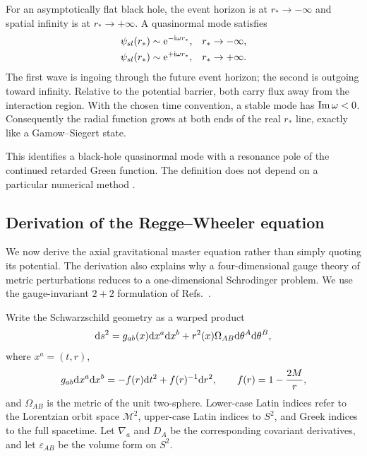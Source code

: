For an asymptotically flat black hole, the event horizon is at
$r_*\to-\infty$ and spatial infinity is at $r_*\to+\infty$.  A quasinormal
mode satisfies
\begin{align}
  \psi_{sl}(r_*)&\sim\mathrm{e}^{-\mathrm{i}\omega r_*},
  &&r_*\to-\infty,
  \notag\\
  \psi_{sl}(r_*)&\sim\mathrm{e}^{+\mathrm{i}\omega r_*},
  &&r_*\to+\infty .
  \label{eq:qnm-boundary-flat}
\end{align}
The first wave is ingoing through the future event horizon; the second is
outgoing toward infinity.  Relative to the potential barrier, both carry flux
away from the interaction region.  With the chosen time convention, a stable
mode has $\operatorname{Im}\omega<0$.  Consequently the radial function grows at both ends
of the real $r_*$ line, exactly like a Gamow--Siegert state.

This identifies a black-hole quasinormal mode with a resonance pole of the
continued retarded Green function.  The definition does not depend on a
particular numerical method
\cite{Kokkotas:1999bd,Berti:2009kk,Hatsuda:2021gtn}.

\subsection{Derivation of the Regge--Wheeler equation}
\label{subsec:regge-wheeler-derivation}

We now derive the axial gravitational master equation rather than simply
quoting its potential.  The derivation also explains why a four-dimensional
gauge theory of metric perturbations reduces to a one-dimensional
Schrodinger problem.  We use the gauge-invariant $2+2$ formulation of
Refs.~\cite{Regge:1957td,Moncrief:1974am,Martel:2005ir,Nagar:2005ea}.

Write the Schwarzschild geometry as a warped product
\begin{equation}
  \mathrm{d} s^2=g_{ab}(x)\mathrm{d} x^a\mathrm{d} x^b
  +r^2(x)\Omega_{AB}\mathrm{d}\theta^A\mathrm{d}\theta^B,
  \label{eq:schwarzschild-warped-product}
\end{equation}
where $x^a=(t,r)$,
\begin{equation}
  g_{ab}\mathrm{d} x^a\mathrm{d} x^b
  =-f(r)\mathrm{d} t^2+f(r)^{-1}\mathrm{d} r^2,
  \qquad f(r)=1-\frac{2M}{r},
  \label{eq:schwarzschild-2metric}
\end{equation}
and $\Omega_{AB}$ is the metric of the unit two-sphere.  Lower-case Latin
indices refer to the Lorentzian orbit space $\mathcal M^2$, upper-case Latin
indices to $S^2$, and Greek indices to the full spacetime.  Let $\nabla_a$
and $D_A$ be the corresponding covariant derivatives, and let
$\varepsilon_{AB}$ be the volume form on $S^2$.

